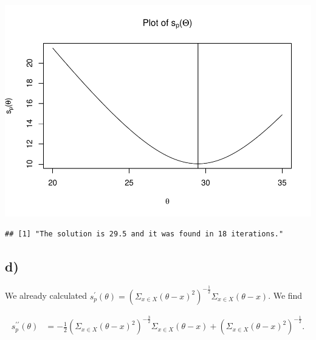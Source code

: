\documentclass[]{article}
\newenvironment{Shaded}{\begin{snugshade}}{\end{snugshade}}
\newcommand{\KeywordTok}[1]{\textcolor[rgb]{0.13,0.29,0.53}{\textbf{{#1}}}}
\newcommand{\DataTypeTok}[1]{\textcolor[rgb]{0.13,0.29,0.53}{{#1}}}
\newcommand{\DecValTok}[1]{\textcolor[rgb]{0.00,0.00,0.81}{{#1}}}
\newcommand{\CharTok}[1]{\textcolor[rgb]{0.31,0.60,0.02}{{#1}}}
\newcommand{\StringTok}[1]{\textcolor[rgb]{0.31,0.60,0.02}{{#1}}}
\newcommand{\NormalTok}[1]{{#1}}
\begin{document}
\begin{Shaded}
\end{Shaded}

\includegraphics{Atlas-PS_2_files/figure-latex/unnamed-chunk-2-1.pdf}

\begin{verbatim}
## [1] "The solution is 29.5 and it was found in 18 iterations."
\end{verbatim}

\subsection{d)}\label{d}

We already calculated
\(s_p^\prime (\theta) = (\Sigma_{x \in X} (\theta - x)^{2})^{-\frac{1}{2}}\Sigma_{x\in X}(\theta - x)\).
We find

\begin{align*}
s_p^{\prime \prime} (\theta) &= -\frac{1}{2} (\Sigma_{x \in X} (\theta - x)^2)^{-\frac{3}{2}}
\Sigma_{x \in X}(\theta - x) +  (\Sigma_{x \in X} (\theta - x)^2)^{-\frac{1}{2}}.
\end{align*}
\end{document}
